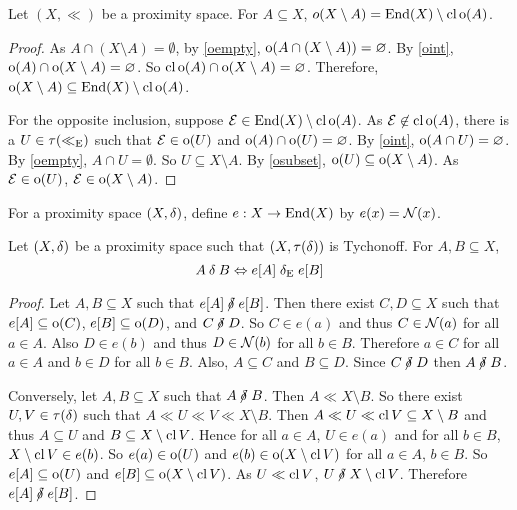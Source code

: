 \begin{proposition}
	\label{ocomp}
	Let \( (X,\ll) \) be a proximity space.  For \( A \subseteq X \),	\( o(X \setminus A) = \operatorname{End}(X) \setminus \operatorname{cl}{\operatorname{o}(A)} \).
\end{proposition}
\begin{proof}
	As \( A \cap (X \setminus A) = \emptyset \), by \ref{oempty}, \( \operatorname{o}(A \cap (X \setminus A)) = \varnothing \).  By \ref{oint}, \( \operatorname{o}(A) \cap \operatorname{o}(X \setminus A) = \varnothing \).  So \( \operatorname{cl}{\operatorname{o}(A)} \cap \operatorname{o}(X \setminus A) = \varnothing \).  Therefore, \( \operatorname{o}(X \setminus A) \subseteq \operatorname{End}(X) \setminus \operatorname{cl}{\operatorname{o}(A)} \).
	
	For the opposite inclusion, suppose \( \mathcal{E} \in \operatorname{End}(X) \setminus \operatorname{cl}{\operatorname{o}(A)} \).  As \( \mathcal{E} \not\in \operatorname{cl}{\operatorname{o}(A)} \), there is a \( U \in \tau(\mathord{\ll_\text{E}}) \) such that \( \mathcal{E} \in \operatorname{o}(U) \) and \( \operatorname{o}(A) \cap \operatorname{o}(U) = \varnothing \).  By \ref{oint}, \( \operatorname{o}(A \cap U) = \varnothing \).  By \ref{oempty}, \( A \cap U = \emptyset \).  So \( U \subseteq X \setminus A \).  By \ref{osubset}, \( \operatorname{o}(U) \subseteq \operatorname{o}(X \setminus A) \).  As \( \mathcal{E} \in \operatorname{o}(U) \), \( \mathcal{E} \in \operatorname{o}(X \setminus A) \).
\end{proof}

\begin{definition}
	For a proximity space \( (X,\mathord{\delta}) \), define \( e:X \to \operatorname{End}(X) \) by \( e(x) = \mathcal{N}(x) \).
\end{definition}

\begin{lemma}
	\label{eneare}
	Let \( (X,\mathord{\delta}) \) be a proximity space such that \( (X,\tau(\mathord{\delta})) \) is Tychonoff.  For \( A,B \subseteq X \),
	\[ A \mathbin{\delta} B \Leftrightarrow e[A] \mathrel{\delta_\text{E}} e[B] \]
\end{lemma}
\begin{proof}
	Let \( A,B \subseteq X \) such that \( e[A] \nnear e[B] \).  Then there exist \( C,D \subseteq X \) such that \( e[A] \subseteq \operatorname{o}(C) \), \( e[B] \subseteq \operatorname{o}(D) \), and \( C \nnear D \).  So \( C \in e(a) \) and thus \( C \in \mathcal{N}(a) \) for all \( a \in A \).  Also \( D \in e(b) \) and thus \( D \in \mathcal{N}(b) \) for all \( b \in B \).  Therefore \( a \in C \) for all \( a \in A \) and \( b \in D \) for all \( b \in B \).  Also, \( A \subseteq C \) and \( B \subseteq D \).  Since \( C \nnear D \) then \( A \nnear B \).
	
	Conversely, let \( A,B \subseteq X \) such that \( A \nnear B \).  Then \( A \ll X \setminus B \).  So there exist \( U,V \in \tau(\mathord{\delta}) \) such that \( A \ll U \ll V \ll X \setminus B \).  Then \( A \ll U \ll \operatorname{cl}{V} \subseteq X \setminus B \) and thus \( A \subseteq U \) and \( B \subseteq X \setminus \operatorname{cl}{V} \).  Hence for all \( a \in A \), \( U \in e(a) \) and for all \( b \in B \), \( X \setminus \operatorname{cl}{V} \in e(b) \).  So \( e(a) \in \operatorname{o}(U) \) and \( e(b) \in \operatorname{o}(X \setminus \operatorname{cl}{V}) \) for all \( a \in A \), \( b \in B \).  So \( e[A] \subseteq \operatorname{o}(U) \) and \( e[B] \subseteq \operatorname{o}(X \setminus \operatorname{cl}{V}) \).  As \( U \ll \operatorname{cl}{V} \), \( U \nnear X \setminus \cl{V} \).  Therefore \( e[A] \nnear e[B] \).
\end{proof}

